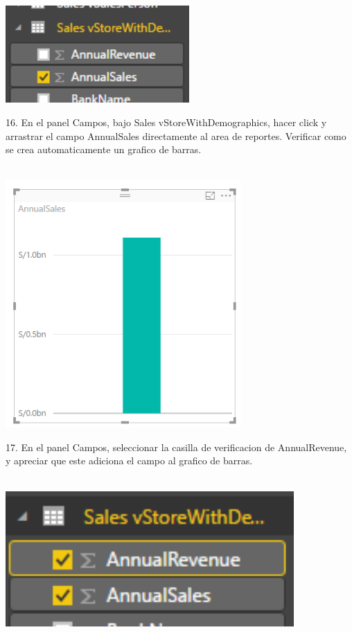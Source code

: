 \documentclass[12pt,letterpaper]{article}
\begin{document}
\begin{center}
\includegraphics[width=7cm]{IMG/31.png} 
\end{center}
16. En el panel Campos, bajo Sales vStoreWithDemographics, hacer click y arrastrar el campo AnnualSales
directamente al area de reportes. Verificar como se crea automaticamente un grafico de barras.\\\\
\begin{center}
\includegraphics[width=9cm]{IMG/32.png} 
\end{center}
17. En el panel Campos, seleccionar la casilla de verificacion de AnnualRevenue, y apreciar que este adiciona el
campo al grafico de barras.\\\\
\begin{center}
\includegraphics[width=11cm]{IMG/33.png} 
\end{center}
\end{document}
